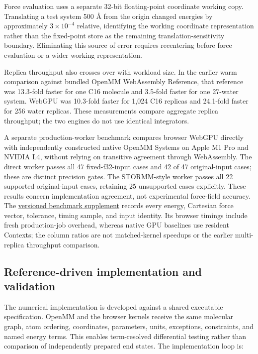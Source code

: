 \documentclass[11pt]{article}
\begin{document}
\begin{small}
Force evaluation uses a separate 32-bit floating-point coordinate working copy. Translating a test system 500 \AA{} from the origin changed energies by approximately $3 \times 10^{-4}$ relative, identifying the working coordinate representation rather than the fixed-point store as the remaining translation-sensitivity boundary. Eliminating this source of error requires recentering before force evaluation or a wider working representation.

Replica throughput also crosses over with workload size. In the earlier warm comparison against bundled OpenMM WebAssembly Reference, that reference was 13.3-fold faster for one C16 molecule and 3.5-fold faster for one 27-water system. WebGPU was 10.3-fold faster for 1,024 C16 replicas and 24.1-fold faster for 256 water replicas. These measurements compare aggregate replica throughput; the two engines do not use identical integrators.

A separate production-worker benchmark compares browser WebGPU directly with independently constructed native OpenMM Systems on Apple M1 Pro and NVIDIA L4, without relying on transitive agreement through WebAssembly. The direct worker passes all 47 fixed-f32-input cases and 42 of 47 original-input cases; these are distinct precision gates. The STORMM-style worker passes all 22 supported original-input cases, retaining 25 unsupported cases explicitly. These results concern implementation agreement, not experimental force-field accuracy. The \href{https://github.com/rafwiewiora/molarium/tree/2ab30383d6160349aa3b1e980f7239d6854b329d/benchmarks/simulation}{versioned benchmark supplement} records every energy, Cartesian force vector, tolerance, timing sample, and input identity. Its browser timings include fresh production-job overhead, whereas native GPU baselines use resident Contexts; the column ratios are not matched-kernel speedups or the earlier multi-replica throughput comparison.

\subsection{Reference-driven implementation and validation}

The numerical implementation is developed against a shared executable specification. OpenMM and the browser kernels receive the same molecular graph, atom ordering, coordinates, parameters, units, exceptions, constraints, and named energy terms. This enables term-resolved differential testing rather than comparison of independently prepared end states. The implementation loop is:


\end{small}
\end{document}
